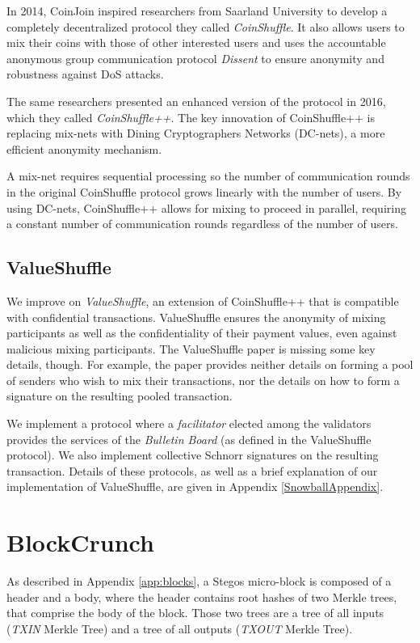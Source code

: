 \documentclass[8pt,fleqn,openany]{book}
\begin{document}
In 2014, CoinJoin inspired researchers from Saarland University to develop a completely decentralized protocol they called \textit{CoinShuffle}\cite{c17}. It also allows users to mix their coins with those of other interested users and uses the accountable anonymous group communication protocol \textit{Dissent} to ensure anonymity and robustness against DoS attacks. 

The same researchers presented an enhanced version of the protocol in 2016, which they called \textit{CoinShuffle++}\cite{c18}. The key innovation of CoinShuffle++ is replacing mix-nets with Dining Cryptographers Networks (DC-nets)\cite{c20}, a more efficient anonymity mechanism. 

A mix-net requires sequential processing so the number of communication rounds in the original CoinShuffle protocol grows linearly with the number of users. By using DC-nets, CoinShuffle++ allows for mixing to proceed in parallel, requiring a constant number of communication rounds regardless of the number of users. 
	
\subsection{ValueShuffle}
We improve on \textit{ValueShuffle}\cite{c19}, an extension of CoinShuffle++ that is compatible with confidential transactions. ValueShuffle ensures the anonymity of mixing participants as well as the confidentiality of their payment values, even against malicious mixing participants. The ValueShuffle paper is missing some key details, though. For example, the paper provides neither details on forming a pool of senders who wish to mix their transactions, nor the details on how to form a signature on the resulting pooled transaction. 

We implement a protocol where a \textit{facilitator} elected among the validators provides the services of the \textit{Bulletin Board} (as defined in the ValueShuffle protocol). We also implement collective Schnorr signatures\cite{c22} on the resulting transaction. Details of these protocols, as well as a brief explanation of our implementation of ValueShuffle, are given in Appendix \ref{SnowballAppendix}.

\section{BlockCrunch}
As described in Appendix \ref{app:blocks}, a Stegos micro-block is composed of a header and a body, where the header contains root hashes of two Merkle trees, that comprise the body of the block. Those two trees are a tree of all inputs (\textit{TXIN} Merkle Tree) and a tree of all outputs (\textit{TXOUT} Merkle Tree). 
\end{document}
